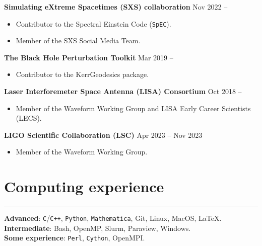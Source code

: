 \documentclass[10.5pt, oneside]{article}   	%
\begin{document}
{\bf Simulating eXtreme Spacetimes (SXS) collaboration}  \hfill Nov 2022 -- \\
\vspace{-5mm}
\begin{itemize}
\item Contributor to the Spectral Einstein Code (\texttt{SpEC}).
\item Member of the SXS Social Media Team.
\end{itemize} 
{\bf The Black Hole Perturbation Toolkit}  \hfill Mar 2019 -- \\
\vspace{-5mm}
\begin{itemize}
\item Contributor to the KerrGeodesics package.
\end{itemize}
{\bf Laser Interforemeter Space Antenna (LISA) Consortium}  \hfill Oct 2018 -- \\
\vspace{-5mm}
\begin{itemize}
\item Member of the Waveform Working Group and LISA Early Career Scientists (LECS).
\end{itemize} 
{\bf LIGO Scientific Collaboration (LSC)}  \hfill Apr 2023 -- Nov 2023 \\
\vspace{-5mm}
\begin{itemize}
\item Member of the Waveform Working Group.
\end{itemize} 


 {\color{Sectioncolour}
\section*{Computing experience}
\vspace{-3mm}
\noindent\rule{\linewidth}{0.6pt}}

\textbf{Advanced}: \texttt{C}/\texttt{C++}, \texttt{Python}, \texttt{Mathematica}, Git, Linux, MacOS, \LaTeX. \vspace{1.5mm} \\ 
\textbf{Intermediate}: Bash, OpenMP, Slurm, Paraview, Windows. \vspace{1.5mm}\\
\textbf{Some experience}: \texttt{Perl}, \texttt{Cython}, OpenMPI.
\end{document}
